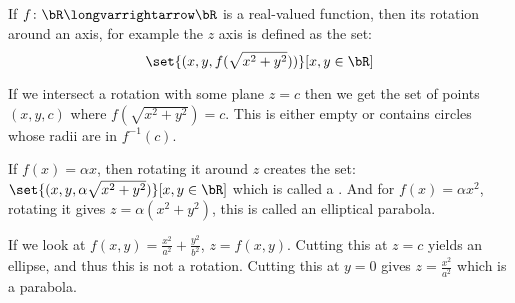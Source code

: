 \documentclass[10pt]{article}
\begin{document}
\begin{defn*}

    If $f\colon\bR\longvarrightarrow\bR$ is a real-valued function, then its rotation around an axis, for example the $z$ axis is defined as the set:
    \[ \set{(x,y,f(\sqrt{x^2+y^2}))}[x,y\in\bR] \]

\end{defn*}

If we intersect a rotation with some plane $z=c$ then we get the set of points $(x,y,c)$ where $f(\sqrt{x^2+y^2})=c$.
This is either empty or contains circles whose radii are in $f^{-1}(c)$.

\begin{exam}

    If $f(x)=\alpha x$, then rotating it around $z$ creates the set: $\set{(x,y,\alpha\sqrt{x^2+y^2})}[x,y\in\bR]$ which is called a .
    And for $f(x)=\alpha x^2$, rotating it gives $z=\alpha(x^2+y^2)$, this is called an elliptical parabola.

\end{exam}

\begin{exam}

    If we look at $f(x,y)=\frac{x^2}{a^2}+\frac{y^2}{b^2}$, $z=f(x,y)$.
    Cutting this at $z=c$ yields an ellipse, and thus this is not a rotation.
    Cutting this at $y=0$ gives $z=\frac{x^2}{a^2}$ which is a parabola.

\end{exam}
\end{document}
